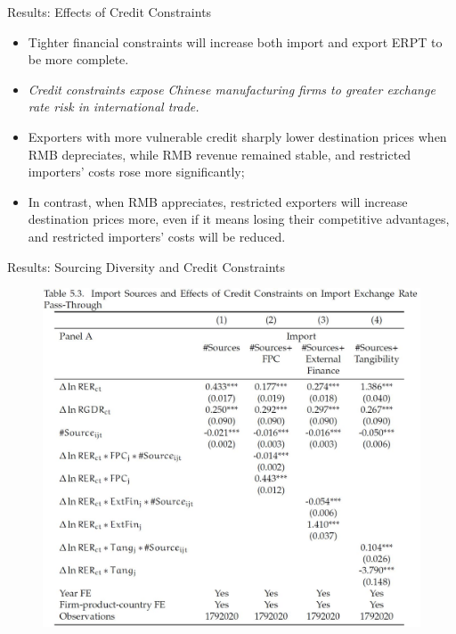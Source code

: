 \documentclass[10pt]{beamer}
\begin{document}
\begin{frame}{Results: Effects of Credit Constraints}
	\begin{tcolorbox}[colback=blue!5!white, colframe=blue!75!black,title=Key Finding 2]
		\begin{itemize}
			\item Tighter financial constraints will increase both import and export ERPT to be more complete.
		\end{itemize}
	\end{tcolorbox}
	\begin{itemize}
		\item \textit{Credit constraints expose Chinese manufacturing firms to greater exchange rate risk in international trade.}
		\item Exporters with more vulnerable credit sharply lower destination prices when RMB depreciates, while RMB revenue remained stable, and restricted importers' costs rose more significantly; 
		\item In contrast, when RMB appreciates, restricted exporters will increase destination prices more, even if it means losing their competitive advantages, and restricted importers' costs will be reduced.
	\end{itemize}
\end{frame}

\begin{frame}{Results: Sourcing Diversity and Credit Constraints}
	\begin{figure}[htbp]
		\centering
		\includegraphics[width=0.75\columnwidth]{Table5.3.jpg}
		\label{tab5.3}
	\end{figure}
\end{frame}
\end{document}
